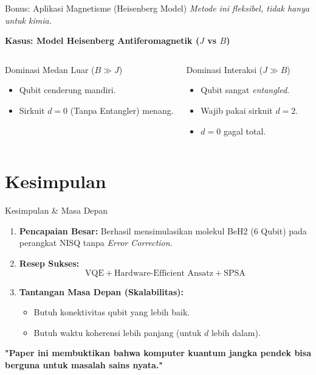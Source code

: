 \documentclass[aspectratio=169, 10pt]{beamer}
\begin{document}
\begin{frame}{Bonus: Aplikasi Magnetisme (Heisenberg Model)}
    \textit{Metode ini fleksibel, tidak hanya untuk kimia.}
    
    \vspace{1em}
    \textbf{Kasus: Model Heisenberg Antiferomagnetik ($J$ vs $B$)}
    
    \begin{columns}
        \begin{block}{Dominasi Medan Luar ($B \gg J$)}
            \begin{itemize}
                \item Qubit cenderung mandiri.
                \item Sirkuit $d=0$ (Tanpa Entangler) menang.
            \end{itemize}
        \end{block}

        \begin{block}{Dominasi Interaksi ($J \gg B$)}
            \begin{itemize}
                \item Qubit sangat \textit{entangled}.
                \item Wajib pakai sirkuit $d=2$.
                \item $d=0$ gagal total.
            \end{itemize}
        \end{block}
    \end{columns}
\end{frame}

\section{Kesimpulan}

\begin{frame}{Kesimpulan & Masa Depan}
    \begin{enumerate}
        \item \textbf{Pencapaian Besar:} Berhasil mensimulasikan molekul BeH2 (6 Qubit) pada perangkat NISQ tanpa \textit{Error Correction}.
        \item \textbf{Resep Sukses:}
        $$ \text{VQE} + \text{Hardware-Efficient Ansatz} + \text{SPSA} $$
        \item \textbf{Tantangan Masa Depan (Skalabilitas):}
        \begin{itemize}
            \item Butuh konektivitas qubit yang lebih baik.
            \item Butuh waktu koherensi lebih panjang (untuk $d$ lebih dalam).
        \end{itemize}
    \end{enumerate}
    
    \vspace{1em}
    \centering
    \large \textbf{"Paper ini membuktikan bahwa komputer kuantum jangka pendek bisa berguna untuk masalah sains nyata."}
\end{frame}
\end{document}
